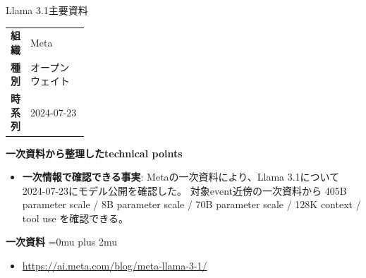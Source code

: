 \begin{technicalnote}{Llama 3.1}{主要資料}
\begingroup
\begin{tabularx}{\linewidth}{@{}>{\bfseries}p{0.22\linewidth}X@{}}
組織 & Meta \\
種別 & オープンウェイト \\
時系列 & 2024-07-23 \\
\end{tabularx}
\smallskip
{\bfseries 一次資料から整理したtechnical points}
\begin{itemize}[leftmargin=1.5em,itemsep=0.35em]
\item \textbf{一次情報で確認できる事実}: Metaの一次資料により、Llama 3.1について2024-07-23にモデル公開を確認した。 対象event近傍の一次資料から 405B parameter scale / 8B parameter scale / 70B parameter scale / 128K context / tool use を確認できる。
\end{itemize}
\begin{minipage}{\linewidth}
\begin{samepage}
{\bfseries 一次資料}
\begingroup\sloppy
\Urlmuskip=0mu plus 2mu\relax
\begin{itemize}[leftmargin=1.5em,itemsep=0.25em]
\item {\scriptsize\url{https://ai.meta.com/blog/meta-llama-3-1/}}
\end{itemize}
\endgroup
\end{samepage}
\end{minipage}
\endgroup
\end{technicalnote}
\medskip

